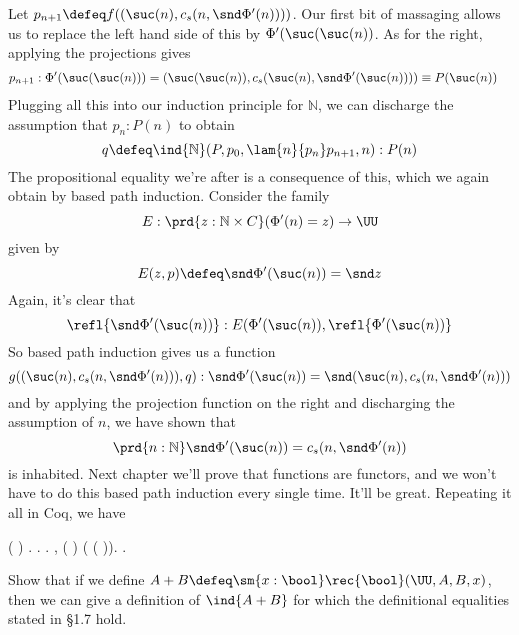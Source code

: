 Let $p_{n+1} \defeq f((\suc(n), c_{s}(n, \snd \Phi'(n))))$.
Our first bit of massaging allows us to replace the left hand side of this by
$\Phi'(\suc(\suc(n))$.  As for the right, applying the projections gives
\begin{align*}
p_{n+1} &: \Phi'(\suc(\suc(n))) 
=
(\suc(\suc(n)), c_{s}(\suc(n), \snd\Phi'(\suc(n)))) 
\equiv P(\suc(n))
\end{align*}
Plugging all this into our induction principle for $\mathbb{N}$, we can
discharge the assumption that $p_{n} : P(n)$ to obtain
\[
q \defeq \ind{\mathbb{N}}(P, p_{0}, \lam{n}{p_{n}}p_{n+1}, n) : P(n)
\]
The propositional equality we're after is a consequence of this, which we again
obtain by based path induction.  Consider the family
\[
  E : \prd{z:\mathbb{N} \times C}(\Phi'(n) = z) \to \UU
\]
given by
\[
  E(z, p) \defeq 
  \snd\Phi'(\suc(n)) = \snd z
\]
Again, it's clear that
\[
\refl{\snd\Phi'(\suc(n))} : E(\Phi'(\suc(n)), \refl{\Phi'(\suc(n))}
\]
So based path induction gives us a function
\[
  g((\suc(n), c_{s}(n, \snd\Phi'(n))), q) : 
  \snd\Phi'(\suc(n)) = \snd (\suc(n), c_{s}(n, \snd\Phi'(n)))
\]
and by applying the projection function on the right and discharging the
assumption of $n$, we have shown that
\[
  \prd{n:\mathbb{N}}\snd\Phi'(\suc(n)) = c_{s}(n, \snd\Phi'(n))
\]
is inhabited.  Next chapter we'll prove that functions are functors, and we
won't have to do this based path induction every single time.  It'll be great.
Repeating it all in Coq, we have\begin{coqdoccode}
\coqdocemptyline
\coqdocnoindent
{}  ( ) \coqdocnotation{=} . . .\coqdoceol
\coqdocemptyline
\coqdocnoindent
{} \coqdockw{\ensuremath{\forall}} , ( ) \coqdocnotation{=}     ( ( )). .\coqdoceol
\coqdocemptyline
\coqdocemptyline
\end{coqdoccode}
Show that if we define $A + B \defeq \sm{x:\bool}
\rec{\bool}(\UU, A, B, x)$, then we can give a definition of $\ind{A+B}$ for
which the definitional equalities stated in \S1.7 hold.


